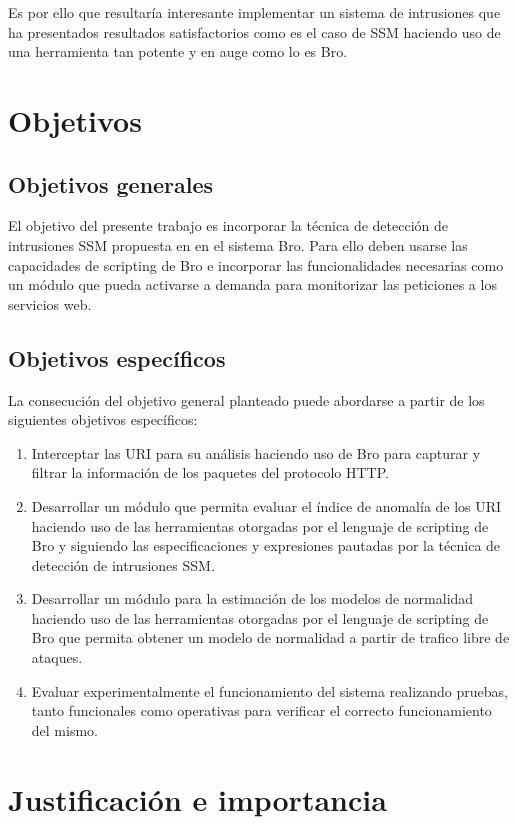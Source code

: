 Es por ello que resultaría interesante implementar un sistema de intrusiones que ha presentados resultados satisfactorios como es el caso de SSM haciendo uso de una herramienta tan potente y en auge como lo es Bro.

\section{Objetivos}
\subsection{Objetivos generales}
El objetivo del presente trabajo es incorporar la técnica de detección de intrusiones SSM propuesta en \cite{ssm} en el sistema Bro. Para ello deben usarse las capacidades de scripting de Bro e incorporar las funcionalidades necesarias como un módulo que pueda activarse a demanda para monitorizar las peticiones a los servicios web.
\subsection{Objetivos específicos}
La consecución del objetivo general planteado puede abordarse a partir de los siguientes objetivos específicos:

\begin{enumerate}
\item Interceptar las URI para su análisis haciendo uso de Bro para capturar y filtrar la información de los paquetes del protocolo HTTP.
\item Desarrollar un módulo que permita evaluar el índice de anomalía de los URI haciendo uso de las herramientas otorgadas por el lenguaje de scripting de Bro y siguiendo las especificaciones y expresiones pautadas por la técnica de detección de intrusiones SSM. 
\item Desarrollar un módulo para la estimación de los modelos de normalidad haciendo uso de las herramientas otorgadas por el lenguaje de scripting de Bro que permita obtener un modelo de normalidad a partir de trafico libre de ataques.
\item Evaluar experimentalmente el funcionamiento del sistema realizando pruebas, tanto funcionales como operativas para verificar el correcto funcionamiento del mismo.
\end{enumerate}

\section{Justificación e importancia}


